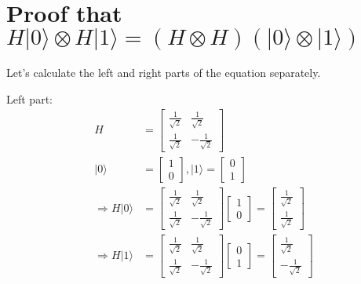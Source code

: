 \documentclass{article}
\begin{document}
\section{Proof that $H|0\rangle \otimes H|1\rangle = (H \otimes H)(|0\rangle \otimes |1\rangle)$}
Let's calculate the left and right parts of the equation separately.

Left part:
\begin{equation}
\begin{split}
    H & = \begin{bmatrix}
        \frac{1}{\sqrt{2}} & \frac{1}{\sqrt{2}} \\
        \frac{1}{\sqrt{2}} & -\frac{1}{\sqrt{2}}
    \end{bmatrix} \\
    |0\rangle & = \begin{bmatrix}
        1 \\
        0
    \end{bmatrix}, |1\rangle = \begin{bmatrix}
        0 \\
        1
    \end{bmatrix} \\
    \Longrightarrow H|0\rangle & = \begin{bmatrix}
        \frac{1}{\sqrt{2}} & \frac{1}{\sqrt{2}} \\
        \frac{1}{\sqrt{2}} & -\frac{1}{\sqrt{2}}
    \end{bmatrix} \begin{bmatrix}
        1 \\
        0
    \end{bmatrix} = \begin{bmatrix}
        \frac{1}{\sqrt{2}} \\
        \frac{1}{\sqrt{2}}
    \end{bmatrix} \\
    \Longrightarrow H|1\rangle & = \begin{bmatrix}
        \frac{1}{\sqrt{2}} & \frac{1}{\sqrt{2}} \\
        \frac{1}{\sqrt{2}} & -\frac{1}{\sqrt{2}}
    \end{bmatrix} \begin{bmatrix}
        0 \\
        1
    \end{bmatrix} = \begin{bmatrix}
        \frac{1}{\sqrt{2}} \\
        -\frac{1}{\sqrt{2}}
    \end{bmatrix} \\

\end{split}
\end{equation}
\end{document}
